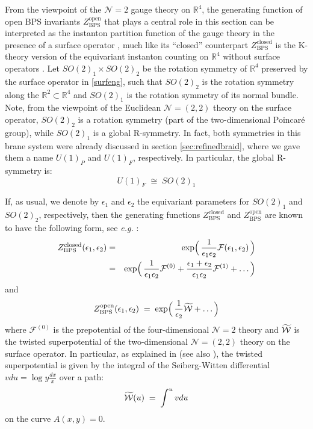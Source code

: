 \documentclass[hyper,letterpaper]{JHEP3}
\newcommand{\bea}{\begin{eqnarray}}
\newcommand{\eea}{\end{eqnarray}}
\newcommand{\be}{\begin{equation}}
\newcommand{\ee}{\end{equation}}
\newcommand{\R}{{\mathbb R}}
\newcommand{\cF}{{\mathcal{F}}}
\newcommand{\cN}{{\mathcal{N}}}
\begin{document}
{}From the viewpoint of the $\cN=2$ gauge theory on $\R^4$,
the generating function of open BPS invariants $Z_{\text{BPS}}^{\text{open}}$
that plays a central role in this section can be interpreted as the instanton partition function
of the gauge theory in the presence of a surface operator \cite{DGH,Braverman,AGGTV,AFKMY},
much like its ``closed'' counterpart $Z_{\text{BPS}}^{\text{closed}}$
is the K-theory version of the equivariant instanton counting on $\R^4$ without surface operators \cite{Nekrasov,NYlectures}.
%
Let $SO(2)_1 \times SO(2)_2$ be the rotation symmetry of $\R^4$ preserved by the surface operator in \eqref{surfeng},
such that $SO(2)_2$ is the rotation symmetry along the $\R^2 \subset \R^4$ and $SO(2)_1$
is the rotation symmetry of its normal bundle.
Note, from the viewpoint of the Euclidean $\cN=(2,2)$ theory on the surface operator,
$SO(2)_2$ is a rotation symmetry (part of the two-dimensional Poincar\'e group),
while $SO(2)_1$ is a global R-symmetry.
In fact, both symmetries in this brane system were already discussed in section \ref{sec:refinedbraid},
where we gave them a name $U(1)_P$ and $U(1)_F$, respectively.
In particular, the global R-symmetry is:
\be
U(1)_F \; \cong \; SO(2)_1
\label{U1Fso2}
\ee

If, as usual, we denote by $\epsilon_1$ and $\epsilon_2$ the equivariant parameters
for $SO(2)_1$ and $SO(2)_2$, respectively,
then the generating functions $Z_{\text{BPS}}^{\text{closed}}$ and $Z_{\text{BPS}}^{\text{open}}$
are known to have the following form, see {\it e.g.} \cite{KreflWalcher,KlemmHuang}:
\bea
Z_{\text{BPS}}^{\text{closed}} (\epsilon_1, \epsilon_2)
& = & \exp \Bigl(\, \frac{1}{\epsilon_1 \epsilon_2} \cF (\epsilon_1, \epsilon_2) \, \Bigr) \label{ZclosedW} \\
& = & \exp \Bigl(\, \frac{1}{\epsilon_1 \epsilon_2} \cF^{(0)}
+ \frac{\epsilon_1 + \epsilon_2}{\epsilon_1 \epsilon_2} \cF^{(1)} + \ldots \, \Bigr) \nonumber
\eea
and
\be
Z_{\text{BPS}}^{\text{open}} (\epsilon_1, \epsilon_2)
\; = \; \exp \Bigl(\, \frac{1}{\epsilon_2} \widetilde{\cal W} + \ldots  \, \Bigr)
\label{ZopenW}
\ee
where $\cF^{(0)}$ is the prepotential of the four-dimensional $\cN=2$ theory
and $\widetilde{\cal W}$ is the twisted superpotential of the two-dimensional $\cN=(2,2)$ theory on the surface operator.
In particular, as explained in \cite{AGGTV} (see also \cite{AwataYamada,TakiMaruyoshi,AFKMY}),
the twisted superpotential is given by the integral
of the Seiberg-Witten differential $v du = \log y \frac{dx}{x}$ over a path:
\be
\widetilde{\cal W} (u) \; = \; \int^u v du
\ee
on the curve $A(x,y)=0$.
\end{document}
